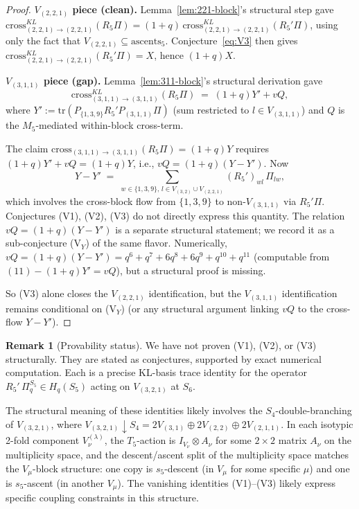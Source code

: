 \documentclass[11pt]{article}
\theoremstyle{definition}
\newtheorem{remark}[theorem]{Remark}
\begin{document}
\begin{proof}
\textbf{$V_{(2,2,1)}$ piece (clean).} Lemma~\ref{lem:221-block}'s structural step gave $\mathrm{cross}_{(2,2,1)\to(2,2,1)}^{KL}(R_5\Pi) = (1+q)\,
\mathrm{cross}_{(2,2,1)\to(2,2,1)}^{KL}(R_5'\Pi)$, using only the fact that $V_{(2,2,1)} \subseteq \mathrm{ascents}_5$. Conjecture~\eqref{eq:V3} then gives $\mathrm{cross}_{(2,2,1)\to(2,2,1)}^{KL}(R_5'\Pi) = X$, hence $(1+q) X$.

\textbf{$V_{(3,1,1)}$ piece (gap).} Lemma~\ref{lem:311-block}'s structural derivation gave
\[
\mathrm{cross}_{(3,1,1)\to(3,1,1)}^{KL}(R_5\Pi) \;=\; (1+q) Y' + v Q,
\]
where $Y' := \mathrm{tr}(P_{\{1,3,9\}} R_5' P_{(3,1,1)} \Pi)$ (sum restricted to $l \in V_{(3,1,1)}$) and $Q$ is the $M_5$-mediated within-block cross-term.

The claim $\mathrm{cross}_{(3,1,1)\to(3,1,1)}(R_5\Pi) = (1+q)Y$ requires $(1+q)Y' + vQ = (1+q)Y$, i.e., $vQ = (1+q)(Y - Y')$. Now
\[
Y - Y' \;=\; \sum_{w \in \{1,3,9\},\, l \in V_{(3,2)} \cup V_{(2,2,1)}} (R_5')_{wl}\,\Pi_{lw},
\]
which involves the cross-block flow from $\{1,3,9\}$ to non-$V_{(3,1,1)}$ via $R_5'\Pi$. Conjectures (V1), (V2), (V3) do not directly express this quantity. The relation $vQ = (1+q)(Y - Y')$ is a separate structural statement; we record it as a sub-conjecture (V$_Y$) of the same flavor. Numerically, $vQ = (1+q)(Y - Y') = q^6 + q^7 + 6q^8 + 6q^9 + q^{10} + q^{11}$ (computable from $(11) - (1+q)Y' = vQ$), but a structural proof is missing.

So (V3) alone closes the $V_{(2,2,1)}$ identification, but the $V_{(3,1,1)}$ identification remains conditional on (V$_Y$) (or any structural argument linking $vQ$ to the cross-flow $Y - Y'$).
\end{proof}

\begin{remark}[Provability status]
We have not proven (V1), (V2), or (V3) structurally. They are stated as
conjectures, supported by exact numerical computation. Each is a precise
KL-basis trace identity for the operator $R_5'\,\Pi_q^{S_5} \in H_q(S_5)$
acting on $V_{(3,2,1)}$ at $S_6$.

The structural meaning of these identities likely involves the
$S_4$-double-branching of $V_{(3,2,1)}$, where $V_{(3,2,1)} \downarrow S_4 = 2 V_{(3,1)} \oplus 2 V_{(2,2)} \oplus 2 V_{(2,1,1)}$. In each isotypic 2-fold component
$V_\nu^{(\lambda)}$, the $T_5$-action is $I_{V_\nu} \otimes A_\nu$ for some
$2 \times 2$ matrix $A_\nu$ on the multiplicity space, and the descent/ascent split
of the multiplicity space matches the $V_\mu$-block structure: one copy is
$s_5$-descent (in $V_\mu$ for some specific $\mu$) and one is $s_5$-ascent
(in another $V_\mu$). The vanishing identities (V1)--(V3) likely express
specific coupling constraints in this structure.
\end{remark}
\end{document}
